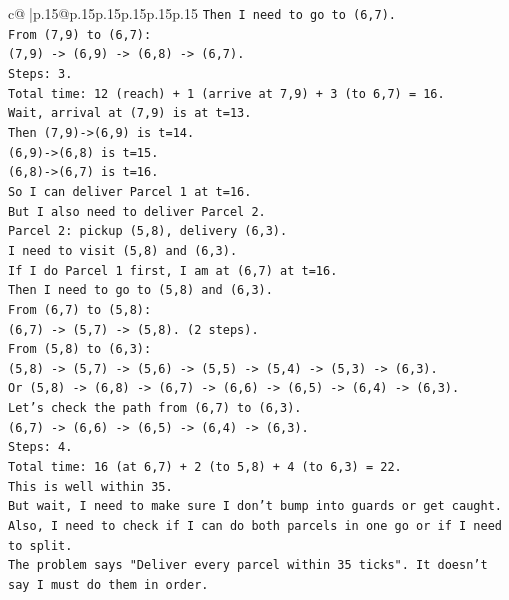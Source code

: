 \documentclass{article}
\begin{document}
{\begin{supertabular}{c@{$\;$}|p{.15\linewidth}@{}p{.15\linewidth}p{.15\linewidth}p{.15\linewidth}p{.15\linewidth}p{.15\linewidth}}
{{{\texttt{Then I need to go to (6,7).} \\
\texttt{From (7,9) to (6,7):} \\
\texttt{(7,9) {-}> (6,9) {-}> (6,8) {-}> (6,7).} \\
\texttt{Steps: 3.} \\
\texttt{Total time: 12 (reach) + 1 (arrive at 7,9) + 3 (to 6,7) = 16.} \\
\texttt{Wait, arrival at (7,9) is at t=13.} \\
\texttt{Then (7,9){-}>(6,9) is t=14.} \\
\texttt{(6,9){-}>(6,8) is t=15.} \\
\texttt{(6,8){-}>(6,7) is t=16.} \\
\texttt{So I can deliver Parcel 1 at t=16.} \\
\texttt{But I also need to deliver Parcel 2.} \\
\texttt{Parcel 2: pickup (5,8), delivery (6,3).} \\
\texttt{I need to visit (5,8) and (6,3).} \\
\texttt{If I do Parcel 1 first, I am at (6,7) at t=16.} \\
\texttt{Then I need to go to (5,8) and (6,3).} \\
\texttt{From (6,7) to (5,8):} \\
\texttt{(6,7) {-}> (5,7) {-}> (5,8). (2 steps).} \\
\texttt{From (5,8) to (6,3):} \\
\texttt{(5,8) {-}> (5,7) {-}> (5,6) {-}> (5,5) {-}> (5,4) {-}> (5,3) {-}> (6,3).} \\
\texttt{Or (5,8) {-}> (6,8) {-}> (6,7) {-}> (6,6) {-}> (6,5) {-}> (6,4) {-}> (6,3).} \\
\texttt{Let's check the path from (6,7) to (6,3).} \\
\texttt{(6,7) {-}> (6,6) {-}> (6,5) {-}> (6,4) {-}> (6,3).} \\
\texttt{Steps: 4.} \\
\texttt{Total time: 16 (at 6,7) + 2 (to 5,8) + 4 (to 6,3) = 22.} \\
\texttt{This is well within 35.} \\
\texttt{But wait, I need to make sure I don't bump into guards or get caught.} \\
\texttt{Also, I need to check if I can do both parcels in one go or if I need to split.} \\
\texttt{The problem says "Deliver every parcel within 35 ticks". It doesn't say I must do them in order.} \\
}}}
\end{supertabular}}
\end{document}
